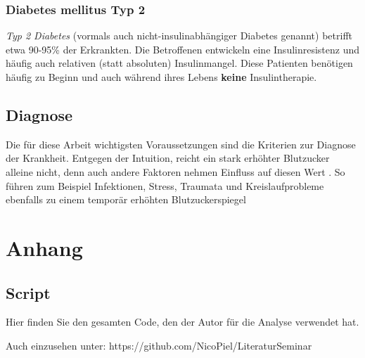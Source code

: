 \documentclass[11.5pt]{article}
\begin{document}
\subsubsection{Diabetes mellitus Typ 2}


\textit{Typ 2 Diabetes} (vormals auch \glqq nicht-insulinabhängiger Diabetes genannt\grqq{}) betrifft etwa 90-95\% der Erkrankten. Die Betroffenen entwickeln eine Insulinresistenz und häufig auch relativen (statt absoluten) Insulinmangel. Diese Patienten benötigen häufig zu Beginn und auch während ihres Lebens \textbf{keine} Insulintherapie. \cite[p.~63]{ada}

\newpage

\subsection{Diagnose}


Die für diese Arbeit wichtigsten Voraussetzungen sind die Kriterien zur Diagnose der Krankheit. Entgegen der Intuition, reicht ein stark erhöhter Blutzucker alleine nicht, denn auch andere Faktoren nehmen Einfluss auf diesen Wert \cite[p.~540]{who}. So führen zum Beispiel Infektionen, Stress, Traumata und Kreislaufprobleme ebenfalls zu einem temporär erhöhten Blutzuckerspiegel \cite[p.~540]{who}


\newpage

\appendix
\section{Anhang}


    
    \hypertarget{diagnose-und-klassifikation-von-diabetes-mellitus-mithilfe-maschinellen-lernens}{%
\subsection{Script}\label{diagnose-und-klassifikation-von-diabetes-mellitus-mithilfe-maschinellen-lernens}}

Hier finden Sie den gesamten Code, den der Autor für die Analyse
verwendet hat.

Auch einzusehen unter: https://github.com/NicoPiel/LiteraturSeminar
\end{document}
